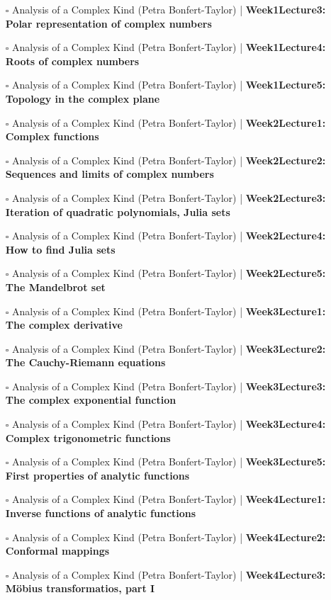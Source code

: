\documentclass[a4, landscape, 12pt]{article}
\newcommand{\checkbox}{$\square$}%
\begin{document}
\begin{itemize}
{}
\item [\checkbox] Analysis of a Complex Kind (Petra Bonfert-Taylor)  | \textbf{Week1Lecture3: Polar representation of complex numbers
}
\item [\checkbox] Analysis of a Complex Kind (Petra Bonfert-Taylor)  | \textbf{Week1Lecture4: Roots of complex numbers
}
\item [\checkbox] Analysis of a Complex Kind (Petra Bonfert-Taylor)  | \textbf{Week1Lecture5: Topology in the complex plane
}
\item [\checkbox] Analysis of a Complex Kind (Petra Bonfert-Taylor)  | \textbf{Week2Lecture1: Complex functions
}
\item [\checkbox] Analysis of a Complex Kind (Petra Bonfert-Taylor)  | \textbf{Week2Lecture2: Sequences and limits of complex numbers
}
\item [\checkbox] Analysis of a Complex Kind (Petra Bonfert-Taylor)  | \textbf{Week2Lecture3: Iteration of quadratic polynomials, Julia sets
}
\item [\checkbox] Analysis of a Complex Kind (Petra Bonfert-Taylor)  | \textbf{Week2Lecture4: How to find Julia sets
}
\item [\checkbox] Analysis of a Complex Kind (Petra Bonfert-Taylor)  | \textbf{Week2Lecture5: The Mandelbrot set
}
\item [\checkbox] Analysis of a Complex Kind (Petra Bonfert-Taylor)  | \textbf{Week3Lecture1: The complex derivative
}
\item [\checkbox] Analysis of a Complex Kind (Petra Bonfert-Taylor)  | \textbf{Week3Lecture2: The Cauchy-Riemann equations
}
\item [\checkbox] Analysis of a Complex Kind (Petra Bonfert-Taylor)  | \textbf{Week3Lecture3: The complex exponential function
}
\item [\checkbox] Analysis of a Complex Kind (Petra Bonfert-Taylor)  | \textbf{Week3Lecture4: Complex trigonometric functions
}
\item [\checkbox] Analysis of a Complex Kind (Petra Bonfert-Taylor)  | \textbf{Week3Lecture5: First properties of analytic functions
}
\item [\checkbox] Analysis of a Complex Kind (Petra Bonfert-Taylor)  | \textbf{Week4Lecture1: Inverse functions of analytic functions
}
\item [\checkbox] Analysis of a Complex Kind (Petra Bonfert-Taylor)  | \textbf{Week4Lecture2: Conformal mappings
}
\item [\checkbox] Analysis of a Complex Kind (Petra Bonfert-Taylor)  | \textbf{Week4Lecture3: Möbius transformatios, part I
}
\end{itemize}
\end{document}
